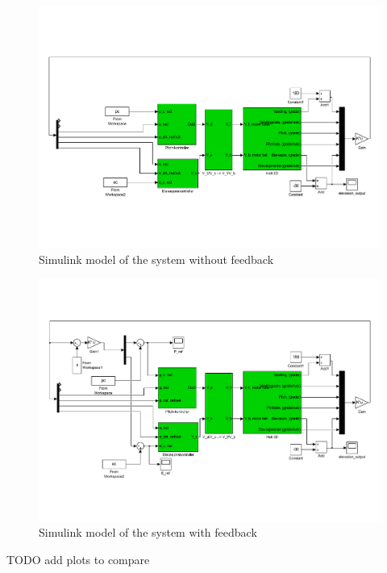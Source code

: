 \begin{figure}[H]
	\centering
	\includegraphics[width=\textwidth, trim=2cm 5cm 2cm 2cm]{simulinkmodels/heldag4UnFeed}
	\caption{Simulink model of the system without feedback}
	\label{fig:heldag4UnFeed}
\end{figure}

\begin{figure}[H]
	\centering
	\includegraphics[width=\textwidth, trim=2cm 5cm 2cm 2cm]{simulinkmodels/heldag4medFeed}
	\caption{Simulink model of the system with feedback}
	\label{fig:heldag4medFeed}
\end{figure}
TODO add plots to compare


